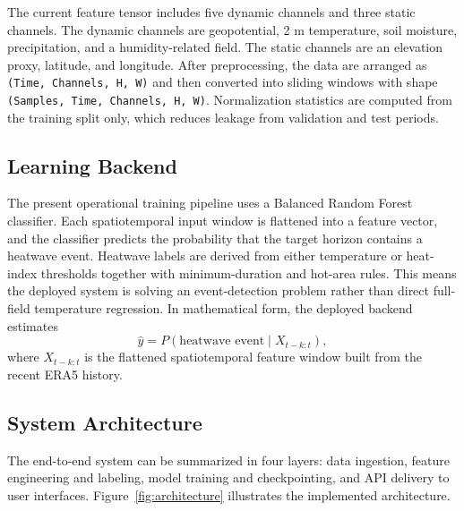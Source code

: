 \documentclass[12pt,a4paper]{article}
\begin{document}
The current feature tensor includes five dynamic channels and three static channels. The dynamic channels are geopotential, 2 m temperature, soil moisture, precipitation, and a humidity-related field. The static channels are an elevation proxy, latitude, and longitude. After preprocessing, the data are arranged as \texttt{(Time, Channels, H, W)} and then converted into sliding windows with shape \texttt{(Samples, Time, Channels, H, W)}. Normalization statistics are computed from the training split only, which reduces leakage from validation and test periods.

\subsection{Learning Backend}
The present operational training pipeline uses a Balanced Random Forest classifier. Each spatiotemporal input window is flattened into a feature vector, and the classifier predicts the probability that the target horizon contains a heatwave event. Heatwave labels are derived from either temperature or heat-index thresholds together with minimum-duration and hot-area rules. This means the deployed system is solving an event-detection problem rather than direct full-field temperature regression. In mathematical form, the deployed backend estimates
\[
\hat{y} = P(\text{heatwave event} \mid X_{t-k:t}),
\]
where $X_{t-k:t}$ is the flattened spatiotemporal feature window built from the recent ERA5 history.

\subsection{System Architecture}
The end-to-end system can be summarized in four layers: data ingestion, feature engineering and labeling, model training and checkpointing, and API delivery to user interfaces. Figure~\ref{fig:architecture} illustrates the implemented architecture.
\end{document}
